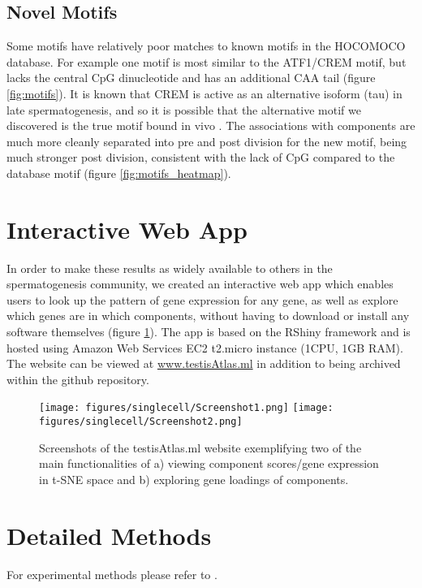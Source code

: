   
\subsection{Novel Motifs}

Some motifs have relatively poor matches to known motifs in the HOCOMOCO database.
For example one motif is most similar to the ATF1/CREM motif, but lacks the central CpG dinucleotide and has an additional CAA tail (figure \ref{fig:motifs}).
It is known that CREM is active as an alternative isoform (tau) in late spermatogenesis, and so it is possible that the alternative motif we discovered is the true motif bound in vivo \parencite{Sassone-Corsi2000CREM}.
The associations with components are much more cleanly separated into pre and post division for the new motif, being much stronger post division, consistent with the lack of CpG compared to the database motif (figure \ref{fig:motifs_heatmap}).



\section{Interactive Web App}
In order to make these results as widely available to others in the spermatogenesis community, we created an interactive web app which enables users to look up the pattern of gene expression for any gene, as well as explore which genes are in which components, without having to download or install any software themselves (figure \ref{fig:shiny}).
The app is based on the RShiny framework and is hosted using Amazon Web Services EC2 t2.micro instance (1CPU, 1GB RAM).
The website can be viewed at \url{www.testisAtlas.ml} in addition to being archived within the github repository.

\begin{figure}[H]
	\centering
	\texttt{[image: figures/singlecell/Screenshot1.png]}
	\texttt{[image: figures/singlecell/Screenshot2.png]}
	\caption[Interactive Web Application]{
		Screenshots of the testisAtlas.ml website exemplifying two of the main functionalities of a) viewing component scores/gene expression in t-SNE space and b) exploring gene loadings of components.
	}
	\label{fig:shiny}
\end{figure}


\section{Detailed Methods}
For experimental methods please refer to \cite{Jung2019Unified}.


